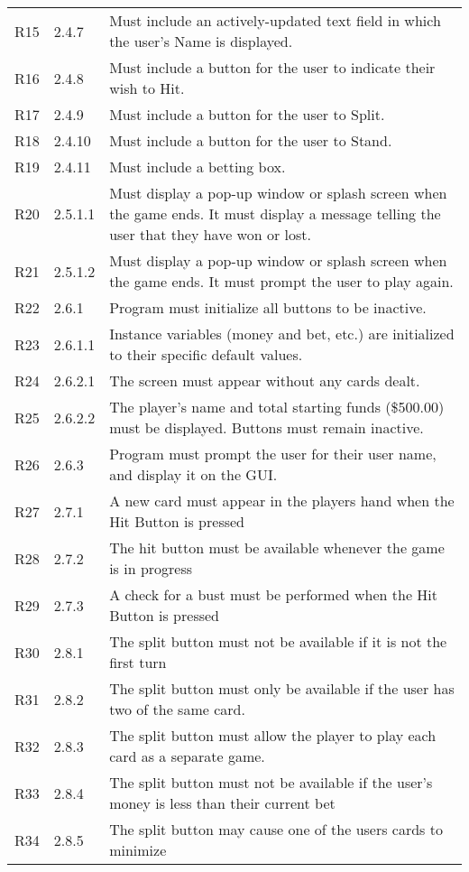 \documentclass [landscape, 8pt] {article}
\begin{document}
\begin {table}[]
\begin {tabular}{p{4cm}p{3cm}p{15cm}}
			R15 & 2.4.7 & Must include an actively-updated text field in which the user's Name is displayed.\\
			R16 & 2.4.8 & Must include a button for the user to indicate their wish to Hit.\\
			R17 & 2.4.9 & Must include a button for the user to Split.\\
			R18 & 2.4.10 & Must include a button for the user to Stand.\\
			R19 & 2.4.11 & Must include a betting box.\\
			R20 & 2.5.1.1 & Must display a pop-up window or splash screen when the game ends. It must display a message telling the user that they have won or lost.\\
			R21 & 2.5.1.2 & Must display a pop-up window or splash screen when the game ends. It must prompt the user to play again.\\
			R22 & 2.6.1 & Program must initialize all buttons to be inactive.\\
			R23 & 2.6.1.1 & Instance variables (money and bet, etc.) are initialized to their specific default values. \\
			R24 & 2.6.2.1 & The screen must appear without any cards dealt.\\
			R25 & 2.6.2.2 & The player's name and total starting funds (\$500.00) must be displayed. Buttons must remain inactive.\\
			R26 & 2.6.3 & Program must prompt the user for their user name, and display it on the GUI. \\
			R27 & 2.7.1 & A new card must appear in the players hand when the Hit Button is pressed\\
			R28 & 2.7.2 & The hit button must be available whenever the game is in progress\\
			R29 & 2.7.3 & A check for a bust must be performed when the Hit Button is pressed\\
			R30 & 2.8.1 & The split button must not be available if it is not the first turn\\
			R31 & 2.8.2 & The split button must only be available if the user has two of the same card.\\
			R32 & 2.8.3 & The split button must allow the player to play each card as a separate game.\\
			R33 & 2.8.4 & The split button must not be available if the user's money is less than their current bet\\
			R34 & 2.8.5 & The split button may cause one of the users cards to minimize\\

\end{tabular}
\end{table}
\end{document}
